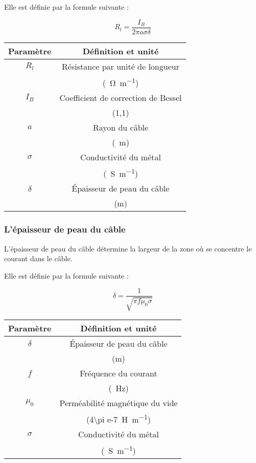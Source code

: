 Elle est définie par la formule suivante :

\[R_l=\frac{I_B}{2\pi a \sigma \delta}\]

\begin{center}
	\begin{tabular}{|c|c|}
		\hline 
		Paramètre & Définition et unité \\
		\hline
		$R_l$ & Résistance par unité de longueur \\
		& (\SI[per-mode = symbol]{}{\ohm\per\m}) \\
		\hline
		$I_B$ & Coefficient de correction de Bessel \\
		& (1,1) \\
		\hline
		$a$ & Rayon du câble \\
		& (\SI{}{\m}) \\
		\hline
		$\sigma$ & Conductivité du métal \\
		& (\SI[per-mode = symbol]{}{\siemens\per\m}) \\
		\hline
		$\delta$ & Épaisseur de peau du câble \\
		& (m) \\	
		\hline
	\end{tabular}
\end{center}

\subsubsection{L'épaisseur de peau du câble}
L'épaisseur de peau du câble détermine la largeur de la zone où se concentre le courant dans le câble.

Elle est définie par la formule suivante :

\[\delta=\frac{1}{\sqrt{\pi f \mu_0\sigma}}\]

\begin{center}
	\begin{tabular}{|c|c|}
		\hline 
		Paramètre & Définition et unité \\
		\hline
		$\delta$ & Épaisseur de peau du câble \\
		& (m) \\
		\hline
		$f$ & Fréquence du courant \\
		& (\SI{}{\hertz}) \\
		\hline
		$\mu_0$ & Perméabilité magnétique du vide \\ 
		& (\SI[per-mode = symbol]{4\pi e-7}{\henry\per\m}) \\
		\hline
		$\sigma$ & Conductivité du métal \\
		& (\SI[per-mode = symbol]{}{\siemens\per\m}) \\
		\hline
	\end{tabular}
\end{center}

